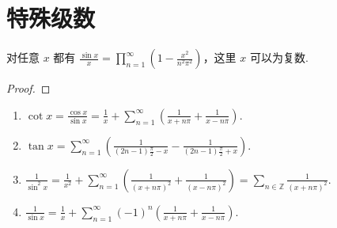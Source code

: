 \documentclass[../../main.tex]{subfiles}
\begin{document}
\section{特殊级数}

\begin{proposition}\label{proposition:sinx/x因式分解}
对任意 $x$ 都有 $\frac{\sin x}{x} = \prod_{n=1}^{\infty} \left(1 - \frac{x^2}{n^2\pi^2}\right)$，这里 $x$ 可以为复数.
\end{proposition}
\begin{proof}


\end{proof}

\begin{proposition}\label{proposition:三角函数的特殊级数表示}
\begin{enumerate}
\item $\cot x = \frac{\cos x}{\sin x} = \frac{1}{x} + \sum_{n=1}^{\infty} \left( \frac{1}{x + n\pi} + \frac{1}{x - n\pi} \right).$

\item $\tan x = \sum_{n=1}^{\infty} \left( \frac{1}{(2n - 1)\frac{\pi}{2} - x} - \frac{1}{(2n - 1)\frac{\pi}{2} + x} \right) .$

\item $\frac{1}{\sin^2 x} = \frac{1}{x^2} + \sum_{n=1}^{\infty} \left( \frac{1}{(x + n\pi)^2} + \frac{1}{(x - n\pi)^2} \right) = \sum_{n \in \mathbb{Z}} \frac{1}{(x + n\pi)^2}.$

\item $\frac{1}{\sin x} = \frac{1}{x} + \sum_{n=1}^{\infty} (-1)^n \left( \frac{1}{x + n\pi} + \frac{1}{x - n\pi} \right).$
\end{enumerate}
\end{proposition}
\end{document}
